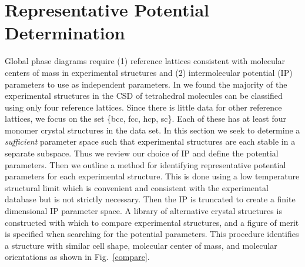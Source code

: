 \documentclass[preprint]{revtex4}
\begin{document}
\section{Representative Potential Determination}
\label{method}

Global phase diagrams require (1) reference lattices consistent with
molecular centers of mass in experimental structures and (2)
intermolecular potential (IP) parameters to use as independent
parameters. In \cite{McClurg05} we found the majority of the
experimental structures in the CSD of tetrahedral molecules can be
classified using only four reference lattices. Since there is little
data for other reference lattices, we focus on the set \{bcc, fcc,
hcp, sc\}. Each of these has at least four monomer
crystal structures in the data set. In this section we seek to
determine a \emph{sufficient} parameter space such that experimental
structures are each stable in a separate subspace. Thus we review
our choice of IP and define the potential parameters.  Then we
outline a method for identifying representative potential parameters
for each experimental structure. This is done using a low
temperature structural limit which is convenient and consistent with the experimental database but is not strictly necessary.  Then
the IP is truncated to create a finite dimensional IP parameter
space.  A library of alternative crystal structures is constructed
with which to compare experimental structures, and a figure of merit
is specified when searching for the potential parameters. This
procedure identifies a structure with similar cell shape, molecular
center of mass, and molecular orientations as shown in
Fig.~\ref{compare}.


\end{document}
